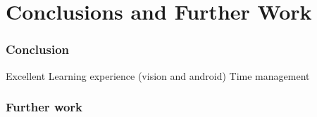 \chapter{Conclusions and Further Work}



\subsection{Conclusion}

Excellent Learning experience (vision and android)
Time management


\subsection{Further work}
